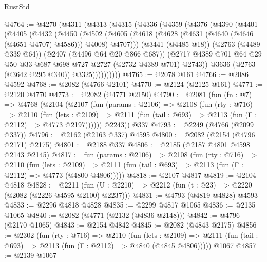\begin{lexlean}{RustStd}
\begin{coremodule}
@4764 := @4270
    (@4311
      (@4313
        (@4315
          (@4336
            (@4359
              (@4376
                (@4390
                  (@4401
                    (@4405
                      (@4432
                        (@4450
                          (@4502
                            (@4605
                              (@4618
                                (@4628 (@4631 (@4640 (@4646 (@4651 @4707) @4586))) @4008)
                                @4707)))
                          (@3441 (@4485 @18))
                          (@2763 (@4489 @339 @64))
                          (@2407 (@4496 @64 @20 @866 @687))
                          (@2717
                            @4389
                            @701
                            @64
                            @29
                            @50
                            @33
                            @687
                            @698
                            @727
                            @2727
                            (@2732 @4389 @701)
                            @2743))
                        @3636
                        (@2763 (@3642 @295 @340))
                        @3325))))))))))
@4765 := @2078 @161
@4766 := @2086 @4592
@4768 := @2082 (@4766 @2101)
@4770 := @2124 (@2125 @161)
@4771 := @2120 @4770
@4773 := @2082 (@4771 @2150)
@4790 := @2081
    (fun (fn : @7) =>
    @4768
      (@2104
        (@2107
          (fun (params : @2106) =>
          @2108
            (fun (rty : @716) =>
            @2110
              (fun (lets : @2109) =>
              @2111 (fun (tail : @693) => @2113 (fun (Γ : @2112) => @4773 @2197))))))
        @2243))
    @337
@4793 := @2249 (@4766 (@2099 @337))
@4796 := @2162 (@2163 @337) @4595
@4800 := @2082 (@2154 (@4796 @2171) @2175)
@4801 := @2188 @337
@4806 := @2185 (@2187 @4801 @4598 @2143 @2145)
@4817 := fun (params : @2106) =>
  @2108
    (fun (rty : @716) =>
    @2110
      (fun (lets : @2109) =>
      @2111 (fun (tail : @693) => @2113 (fun (Γ : @2112) => @4773 (@4800 @4806)))))
@4818 := @2107 @4817
@4819 := @2104 @4818
@4828 := @2211 (fun (U : @2210) => @2212 (fun (t : @23) => @2220 (@2082 (@2226 @4595 @2100) @2237)))
@4831 := @4793 (@4819 @4828) @4593
@4833 := @2296 @4818 @4828
@4835 := @2299 @4817 @1065
@4836 := @2135 @1065
@4840 := @2082 (@4771 (@2132 (@4836 @2148)))
@4842 := @4796 (@2170 @1065)
@4843 := @2154 @4842
@4845 := @2082 (@4843 @2175)
@4856 := @2302
    (fun (rty : @716) =>
    @2110
      (fun (lets : @2109) =>
      @2111 (fun (tail : @693) => @2113 (fun (Γ : @2112) => @4840 (@4845 @4806)))))
    @1067
@4857 := @2139 @1067

\end{coremodule}
\end{lexlean}
